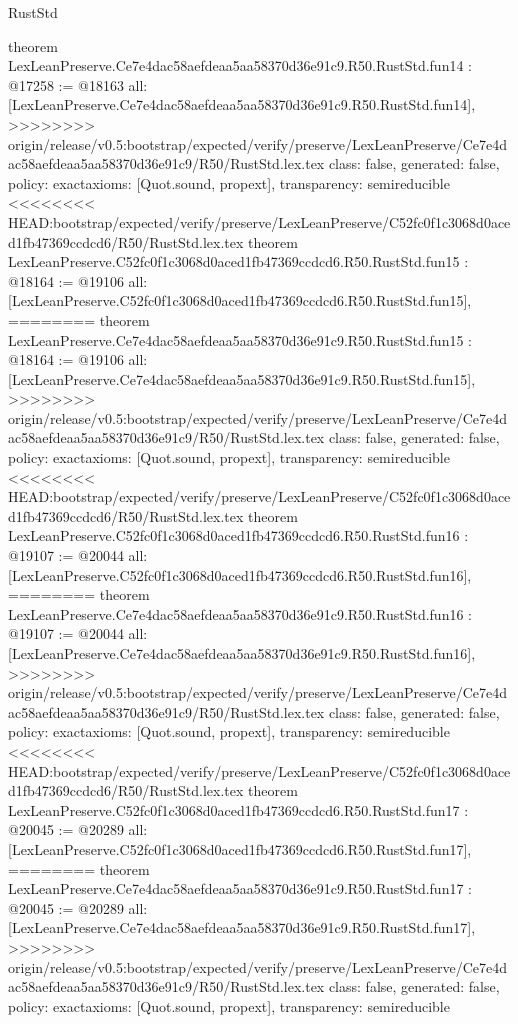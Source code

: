 \begin{lexlean}{RustStd}
\begin{coremodule}
{\begin{coremodule}
{{{{{{{{{{{{{{{{{theorem LexLeanPreserve.Ce7e4dac58aefdeaa5aa58370d36e91c9.R50.RustStd.fun14 : @17258 := @18163 {
  all: [LexLeanPreserve.Ce7e4dac58aefdeaa5aa58370d36e91c9.R50.RustStd.fun14],
>>>>>>>> origin/release/v0.5:bootstrap/expected/verify/preserve/LexLeanPreserve/Ce7e4dac58aefdeaa5aa58370d36e91c9/R50/RustStd.lex.tex
  class: false,
  generated: false,
  policy: exact{axioms: [Quot.sound, propext]},
  transparency: semireducible
}
<<<<<<<< HEAD:bootstrap/expected/verify/preserve/LexLeanPreserve/C52fc0f1c3068d0aced1fb47369ccdcd6/R50/RustStd.lex.tex
theorem LexLeanPreserve.C52fc0f1c3068d0aced1fb47369ccdcd6.R50.RustStd.fun15 : @18164 := @19106 {
  all: [LexLeanPreserve.C52fc0f1c3068d0aced1fb47369ccdcd6.R50.RustStd.fun15],
========
theorem LexLeanPreserve.Ce7e4dac58aefdeaa5aa58370d36e91c9.R50.RustStd.fun15 : @18164 := @19106 {
  all: [LexLeanPreserve.Ce7e4dac58aefdeaa5aa58370d36e91c9.R50.RustStd.fun15],
>>>>>>>> origin/release/v0.5:bootstrap/expected/verify/preserve/LexLeanPreserve/Ce7e4dac58aefdeaa5aa58370d36e91c9/R50/RustStd.lex.tex
  class: false,
  generated: false,
  policy: exact{axioms: [Quot.sound, propext]},
  transparency: semireducible
}
<<<<<<<< HEAD:bootstrap/expected/verify/preserve/LexLeanPreserve/C52fc0f1c3068d0aced1fb47369ccdcd6/R50/RustStd.lex.tex
theorem LexLeanPreserve.C52fc0f1c3068d0aced1fb47369ccdcd6.R50.RustStd.fun16 : @19107 := @20044 {
  all: [LexLeanPreserve.C52fc0f1c3068d0aced1fb47369ccdcd6.R50.RustStd.fun16],
========
theorem LexLeanPreserve.Ce7e4dac58aefdeaa5aa58370d36e91c9.R50.RustStd.fun16 : @19107 := @20044 {
  all: [LexLeanPreserve.Ce7e4dac58aefdeaa5aa58370d36e91c9.R50.RustStd.fun16],
>>>>>>>> origin/release/v0.5:bootstrap/expected/verify/preserve/LexLeanPreserve/Ce7e4dac58aefdeaa5aa58370d36e91c9/R50/RustStd.lex.tex
  class: false,
  generated: false,
  policy: exact{axioms: [Quot.sound, propext]},
  transparency: semireducible
}
<<<<<<<< HEAD:bootstrap/expected/verify/preserve/LexLeanPreserve/C52fc0f1c3068d0aced1fb47369ccdcd6/R50/RustStd.lex.tex
theorem LexLeanPreserve.C52fc0f1c3068d0aced1fb47369ccdcd6.R50.RustStd.fun17 : @20045 := @20289 {
  all: [LexLeanPreserve.C52fc0f1c3068d0aced1fb47369ccdcd6.R50.RustStd.fun17],
========
theorem LexLeanPreserve.Ce7e4dac58aefdeaa5aa58370d36e91c9.R50.RustStd.fun17 : @20045 := @20289 {
  all: [LexLeanPreserve.Ce7e4dac58aefdeaa5aa58370d36e91c9.R50.RustStd.fun17],
>>>>>>>> origin/release/v0.5:bootstrap/expected/verify/preserve/LexLeanPreserve/Ce7e4dac58aefdeaa5aa58370d36e91c9/R50/RustStd.lex.tex
  class: false,
  generated: false,
  policy: exact{axioms: [Quot.sound, propext]},
  transparency: semireducible
}}}}}}}}}}}}}}}}}}}}}
\end{coremodule}}
\end{coremodule}
\end{lexlean}
